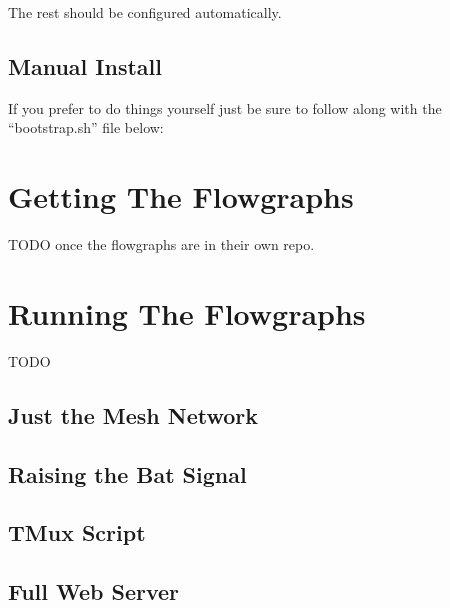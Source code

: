 The rest should be configured automatically.

\subsection{Manual Install}

If you prefer to do things yourself just be sure to follow along with the ``bootstrap.sh'' file below:



\section{Getting The Flowgraphs}

TODO once the flowgraphs are in their own repo. 

\section{Running The Flowgraphs}

TODO

\subsection{Just the Mesh Network}

\subsection{Raising the Bat Signal}

\subsection{TMux Script}

\subsection{Full Web Server}


